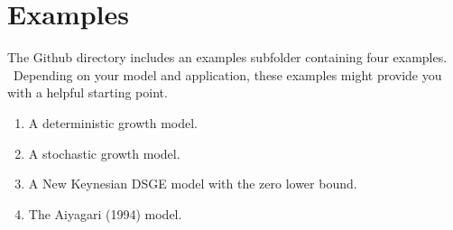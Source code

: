 \documentclass[notitlepage,11pt]{article}
\begin{document}
\section{Examples}

The Github directory includes an examples subfolder containing four
examples. \ Depending on your model and application, these examples might
provide you with a helpful starting point.

\begin{enumerate}
\item A deterministic growth model.

\item A stochastic growth model.

\item A New Keynesian DSGE model with the zero lower bound.

\item The Aiyagari (1994) model.
\end{enumerate}
\end{document}
